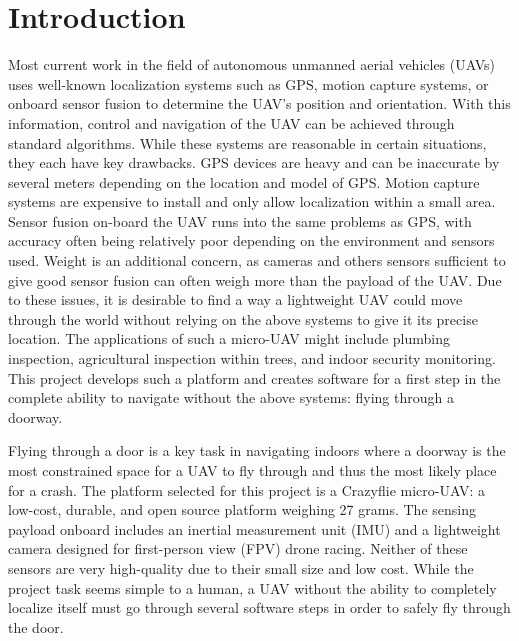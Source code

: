 \documentclass[12pt]{article}
\begin{document}










\section{Introduction}
Most current work in the field of autonomous unmanned aerial vehicles (UAVs) uses well-known localization systems such as GPS, motion capture systems, or onboard sensor fusion to determine the UAV's position and orientation. With this information, control and navigation of the UAV can be achieved through standard algorithms. While these systems are reasonable in certain situations, they each have key drawbacks. GPS devices are heavy and can be inaccurate by several meters depending on the location and model of GPS. Motion capture systems are expensive to install and only allow localization within a small area. Sensor fusion on-board the UAV runs into the same problems as GPS, with accuracy often being relatively poor depending on the environment and sensors used. Weight is an additional concern, as cameras and others sensors sufficient to give good sensor fusion can often weigh more than the payload of the UAV. Due to these issues, it is desirable to find a way a lightweight UAV could move through the world without relying on the above systems to give it its precise location. The applications of such a micro-UAV might include plumbing inspection, agricultural inspection within trees, and indoor security monitoring. This project develops such a platform and creates software for a first step in the complete ability to navigate without the above systems: flying through a doorway. 

Flying through a door is a key task in navigating indoors where a doorway is the most constrained space for a UAV to fly through and thus the most likely place for a crash. The platform selected for this project is a Crazyflie micro-UAV: a low-cost, durable, and open source platform weighing 27 grams. The sensing payload onboard includes an inertial measurement unit (IMU) and a lightweight camera designed for first-person view (FPV) drone racing. Neither of these sensors are very high-quality due to their small size and low cost. While the project task seems simple to a human, a UAV without the ability to completely localize itself must go through several software steps in order to safely fly through the door. 
\end{document}
